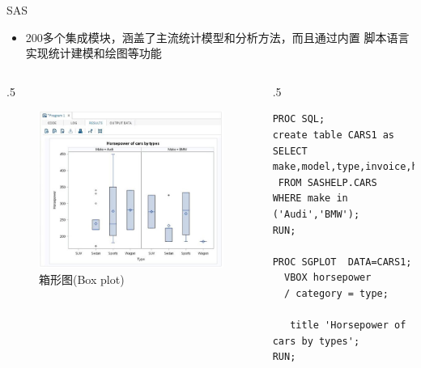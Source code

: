 \documentclass{beamerthemeMono}
\begin{document}
\begin{frame}[t, fragile]{\subsecname}{SAS}
  \begin{itemize}
    \item 200多个集成模块，涵盖了主流统计模型和分析方法，而且通过内置
           脚本语言实现统计建模和绘图等功能
  \end{itemize}
 
      \begin{columns}
        \begin{column}[c]{.5\textwidth}
          \centering 
          \begin{figure}
            \includegraphics[width=0.8\columnwidth]{sas_boxplot.png}
            \caption{箱形图(Box plot)}
          \end{figure}
        \end{column}

        \begin{column}[c]{.5\textwidth}\centering
\begin{lstlisting}[language=SAS]
PROC SQL;
create table CARS1 as
SELECT make,model,type,invoice,horsepower,length,weight
 FROM SASHELP.CARS
WHERE make in ('Audi','BMW');
RUN;

PROC SGPLOT  DATA=CARS1;
  VBOX horsepower 
  / category = type;

   title 'Horsepower of cars by types';
RUN; 
\end{lstlisting}
        \end{column}
      \end{columns}
\end{frame}
\end{document}
